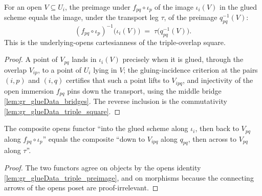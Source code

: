 \begin{lemma}

  \label{lem:gr_glueData_triple_preimage}
  For an open \(V \subseteq U_i\), the preimage under \(f_{pq}\circ\iota_p\) of the image
  \(\iota_i(V)\) in the glued scheme equals the image, under the transport leg \(\tau\),
  of the preimage \(q_{pq}^{-1}(V)\):
  \[
    (f_{pq}\circ\iota_p)^{-1}\bigl(\iota_i(V)\bigr)
      \;=\; \tau\bigl(q_{pq}^{-1}(V)\bigr).
  \]
  This is the underlying-opens cartesianness of the triple-overlap square.
\end{lemma}
\begin{proof}
  \leanok
  A point of \(V_{pq}\) lands in \(\iota_i(V)\) precisely when it is glued, through the
  overlap \(V_{ip}\), to a point of \(U_i\) lying in \(V\); the gluing-incidence
  criterion at the pairs \((i,p)\) and \((i,q)\) certifies that such a point lifts to
  \(V_{ipq}\), and injectivity of the open immersion \(f_{pq}\) pins down the transport,
  using the middle bridge \cref{lem:gr_glueData_bridges}. The reverse inclusion is the
  commutativity \cref{lem:gr_glueData_triple_square}.
\end{proof}

\begin{lemma}

  \label{lem:gr_glueData_triple_opensFunctor_eq}
  The composite opens functor ``into the glued scheme along \(\iota_i\), then back to
  \(V_{pq}\) along \(f_{pq}\circ\iota_p\)'' equals the composite ``down to \(V_{ipq}\)
  along \(q_{pq}\), then across to \(V_{pq}\) along \(\tau\)''.
\end{lemma}
\begin{proof}
  \leanok
  The two functors agree on objects by the opens identity
  \cref{lem:gr_glueData_triple_preimage}, and on morphisms because the connecting arrows
  of the opens poset are proof-irrelevant.
\end{proof}

